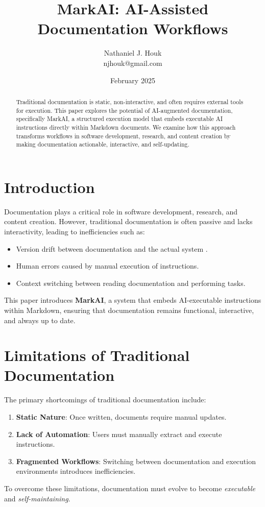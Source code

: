 \documentclass{article}
\title{MarkAI: AI-Assisted Documentation Workflows}
\author{Nathaniel J. Houk \\ njhouk@gmail.com}
\date{February 2025}
\begin{document}
\maketitle
\tableofcontents

\begin{abstract}
Traditional documentation is static, non-interactive, and often requires external tools for execution. This paper explores the potential of AI-augmented documentation, specifically MarkAI, a structured execution model that embeds executable AI instructions directly within Markdown documents. We examine how this approach transforms workflows in software development, research, and content creation by making documentation actionable, interactive, and self-updating.
\end{abstract}

\section{Introduction}
Documentation plays a critical role in software development, research, and content creation. However, traditional documentation is often passive and lacks interactivity, leading to inefficiencies such as:
\begin{itemize}
    \item Version drift between documentation and the actual system \cite{placeholder}.
    \item Human errors caused by manual execution of instructions.
    \item Context switching between reading documentation and performing tasks.
\end{itemize}
This paper introduces \textbf{MarkAI}, a system that embeds AI-executable instructions within Markdown, ensuring that documentation remains functional, interactive, and always up to date.

\section{Limitations of Traditional Documentation}
The primary shortcomings of traditional documentation include:
\begin{enumerate}
    \item \textbf{Static Nature}: Once written, documents require manual updates.
    \item \textbf{Lack of Automation}: Users must manually extract and execute instructions.
    \item \textbf{Fragmented Workflows}: Switching between documentation and execution environments introduces inefficiencies.
\end{enumerate}
To overcome these limitations, documentation must evolve to become \textit{executable} and \textit{self-maintaining}.
\end{document}
